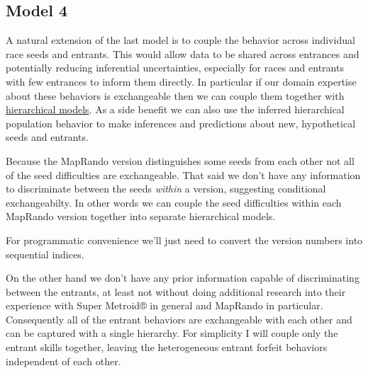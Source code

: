 \documentclass[
  letterpaper,
  DIV=11,
  numbers=noendperiod]{scrartcl}
\newenvironment{Shaded}{\begin{snugshade}}{\end{snugshade}}
\newcommand{\AttributeTok}[1]{\textcolor[rgb]{0.40,0.45,0.13}{#1}}
\newcommand{\DecValTok}[1]{\textcolor[rgb]{0.68,0.00,0.00}{#1}}
\newcommand{\FunctionTok}[1]{\textcolor[rgb]{0.28,0.35,0.67}{#1}}
\newcommand{\NormalTok}[1]{\textcolor[rgb]{0.00,0.23,0.31}{#1}}
\newcommand{\OtherTok}[1]{\textcolor[rgb]{0.00,0.23,0.31}{#1}}
\newcommand{\SpecialCharTok}[1]{\textcolor[rgb]{0.37,0.37,0.37}{#1}}
\begin{document}
\subsection{Model 4}\label{model-4}

A natural extension of the last model is to couple the behavior across
individual race seeds and entrants. This would allow data to be shared
across entrances and potentially reducing inferential uncertainties,
especially for races and entrants with few entrances to inform them
directly. In particular if our domain expertise about these behaviors is
exchangeable then we can couple them together with
\href{https://betanalpha.github.io/assets/case_studies/hierarchical_modeling.html}{hierarchical
models}. As a side benefit we can also use the inferred hierarchical
population behavior to make inferences and predictions about new,
hypothetical seeds and entrants.

Because the MapRando version distinguishes some seeds from each other
not all of the seed difficulties are exchangeable. That said we don't
have any information to discriminate between the seeds \emph{within} a
version, suggesting conditional exchangeabilty. In other words we can
couple the seed difficulties within each MapRando version together into
separate hierarchical models.

For programmatic convenience we'll just need to convert the version
numbers into sequential indices.

\begin{Shaded}
\end{Shaded}

On the other hand we don't have any prior information capable of
discriminating between the entrants, at least not without doing
additional research into their experience with Super Metroid® in general
and MapRando in particular. Consequently all of the entrant behaviors
are exchangeable with each other and can be captured with a single
hierarchy. For simplicity I will couple only the entrant skills
together, leaving the heterogeneous entrant forfeit behaviors
independent of each other.
\end{document}
